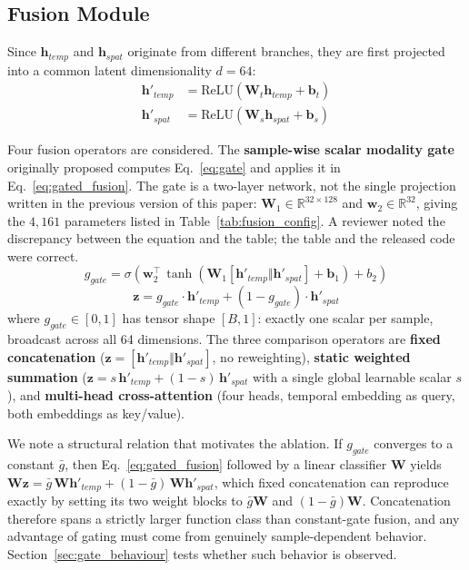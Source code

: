 \documentclass[journal]{IEEEtran}
\begin{document}
\subsection{Fusion Module}
\label{sec:fusion_module}
Since $\mathbf{h}_{temp}$ and $\mathbf{h}_{spat}$ originate from different branches, they are first projected into a common latent dimensionality $d = 64$:
\begin{align}
  \mathbf{h}'_{temp} &= \text{ReLU}(\mathbf{W}_t \mathbf{h}_{temp} + \mathbf{b}_t) \\
  \mathbf{h}'_{spat} &= \text{ReLU}(\mathbf{W}_s \mathbf{h}_{spat} + \mathbf{b}_s)
\end{align}

Four fusion operators are considered. The \textbf{sample-wise scalar modality gate} originally proposed computes Eq.~\ref{eq:gate} and applies it in Eq.~\ref{eq:gated_fusion}. The gate is a two-layer network, not the single projection written in the previous version of this paper: $\mathbf{W}_1 \in \mathbb{R}^{32 \times 128}$ and $\mathbf{w}_2 \in \mathbb{R}^{32}$, giving the $4{,}161$ parameters listed in Table~\ref{tab:fusion_config}. A reviewer noted the discrepancy between the equation and the table; the table and the released code were correct.
\begin{equation}
  \label{eq:gate}
  g_{gate} = \sigma\!\left(\mathbf{w}_2^{\top}\,\tanh\!\left(\mathbf{W}_1 [\mathbf{h}'_{temp} \Vert \mathbf{h}'_{spat}] + \mathbf{b}_1\right) + b_2\right)
\end{equation}
\begin{equation}
  \label{eq:gated_fusion}
  \mathbf{z} = g_{gate} \cdot \mathbf{h}'_{temp} + (1 - g_{gate}) \cdot \mathbf{h}'_{spat}
\end{equation}
where $g_{gate}\in[0,1]$ has tensor shape $[B,1]$: exactly one scalar per sample, broadcast across all 64 dimensions. The three comparison operators are \textbf{fixed concatenation} ($\mathbf{z} = [\mathbf{h}'_{temp} \Vert \mathbf{h}'_{spat}]$, no reweighting), \textbf{static weighted summation} ($\mathbf{z} = s\,\mathbf{h}'_{temp} + (1-s)\,\mathbf{h}'_{spat}$ with a single global learnable scalar $s$), and \textbf{multi-head cross-attention} (four heads, temporal embedding as query, both embeddings as key/value).

We note a structural relation that motivates the ablation. If $g_{gate}$ converges to a constant $\bar{g}$, then Eq.~\ref{eq:gated_fusion} followed by a linear classifier $\mathbf{W}$ yields $\mathbf{W}\mathbf{z} = \bar{g}\,\mathbf{W}\mathbf{h}'_{temp} + (1-\bar{g})\,\mathbf{W}\mathbf{h}'_{spat}$, which fixed concatenation can reproduce exactly by setting its two weight blocks to $\bar{g}\mathbf{W}$ and $(1-\bar{g})\mathbf{W}$. Concatenation therefore spans a strictly larger function class than constant-gate fusion, and any advantage of gating must come from genuinely sample-dependent behavior. Section~\ref{sec:gate_behaviour} tests whether such behavior is observed.
\end{document}
